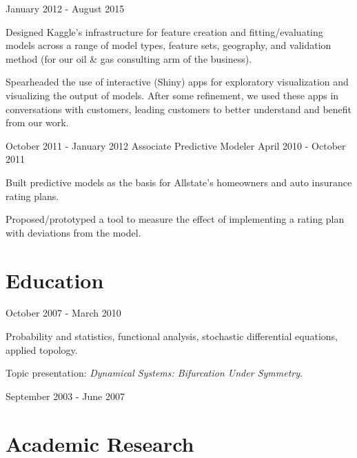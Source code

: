 \documentclass[letterpaper]{resume}
\begin{document}
{January 2012 - August 2015}


\begin{compactitem}
\item Designed Kaggle's infrastructure for feature creation and fitting/evaluating models across a range of model types, feature sets, geography, and validation method (for our oil \& gas consulting arm of the business).
\item Spearheaded the use of interactive (Shiny) apps for exploratory visualization and visualizing the output of models. After some refinement, we used these apps in conversations with customers, leading customers to better understand and benefit from our work.
\end{compactitem}


{October 2011 - January 2012}
{Associate Predictive Modeler}
{April 2010 - October 2011}


\begin{compactitem}
\item Built predictive models as the basis for Allstate's homeowners and auto insurance rating plans.
\item Proposed/prototyped a tool to measure the effect of implementing a rating plan with deviations from the model.
\end{compactitem}

\section{Education}

{October 2007 - March 2010}
{}
{}
\begin{compactitem}
\item Probability and statistics, functional analysis, stochastic differential equations, applied topology.
\item Topic presentation: \textit{Dynamical Systems: Bifurcation Under Symmetry}.
\end{compactitem}


{September 2003 - June 2007}
{}
{}

\section{Academic Research}
\end{document}
